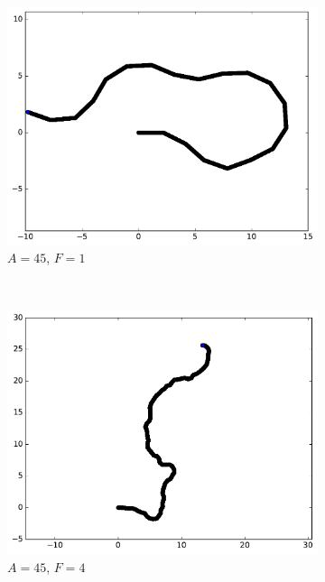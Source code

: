 \begin{appendices}
	\begin{figure}[htbp]
		\begin{subfigure}[t]{\subImgWmo}
			\centering
			\includegraphics[width=\textwidth]{figures/ch3/synTraj_219_45_1}
			\caption[$A = 45$, $F=1$]{$A = 45$, $F=1$}
			\label{fig:synTraj_219_45_1}
		\end{subfigure}
		~
		\begin{subfigure}[t]{\subImgWmo}
			\centering
			\includegraphics[width=\textwidth]{figures/ch3/synTraj_219_45_4}
			\caption[$A = 45$, $F=4$]{$A = 45$, $F=4$}
			\label{fig:synTraj_219_45_4}
		\end{subfigure}
		~
		\begin{subfigure}[t]{\subImgWmo}

\end{subfigure}
\end{figure}
\end{appendices}
